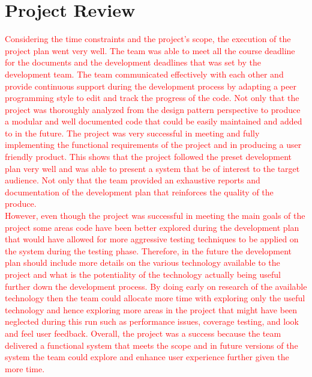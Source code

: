 \documentclass{article}
\begin{document}
\section{Project Review}
\textcolor{red}{Considering the time constraints and the project's scope, the execution of the project plan went very well. The team was able to meet all the course deadline for the documents and the development deadlines that was set by the development team. The team communicated effectively with each other and provide continuous support during the development process by adapting a peer programming style to edit and track the progress of the code. Not only that the project was thoroughly analyzed from the design pattern perspective to produce a modular and well documented code that could be easily maintained and added to in the future. The project was very successful in meeting and fully implementing the functional requirements of the project and in producing a user friendly product. This shows that the project followed the preset development plan very well and was able to present a system that be of interest to the target audience. Not only that the team provided an exhaustive reports and documentation of the development plan that reinforces the quality of the produce.\\
However, even though the project was successful in meeting the main goals of the project some areas code have been better explored during the development plan that would have allowed for more aggressive testing techniques to be applied on the system during the testing phase. Therefore, in the future the development plan should include more details on the various technology available to the project and what is the potentiality of the technology actually being useful further down the development process. By doing early on research of the available technology then the team could allocate more time with exploring only the useful technology and hence exploring more areas in the project that might have been neglected during this run such as performance issues, coverage testing, and look and feel user feedback. Overall, the project was a success because the team delivered a functional system that meets the scope and in future versions of the system the team could explore and enhance user experience further given the more time.}
\end{document}
